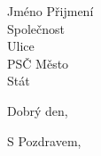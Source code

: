 \documentclass[11pt]{letter}
\begin{document}
\begin{letter}{
  Jméno Přijmení \\
  Společnost \\
  Ulice \\
  PSČ Město \\
  Stát
}

\address{
  Jméno Přijmení \\
  Společnost \\
  Ulice \\
  PSČ Město \\
  Stát
}

\signature{}

\opening{Dobrý den,}


\closing{S Pozdravem,}


\end{letter}

\end{document}

